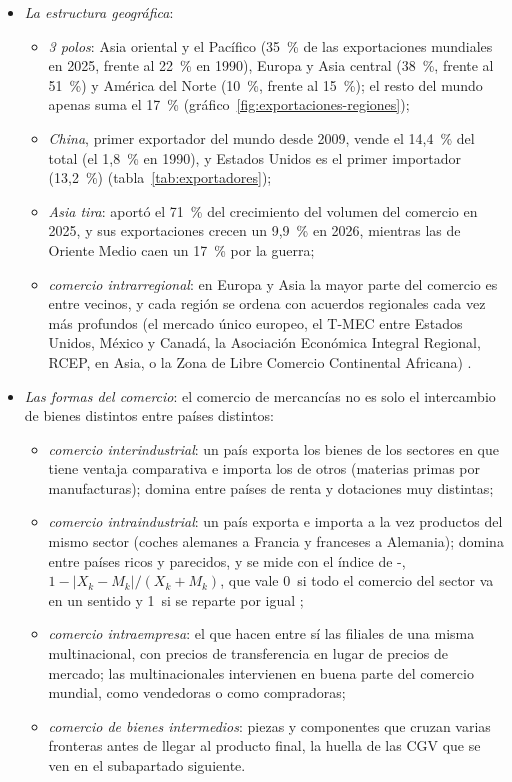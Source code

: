 \documentclass[11pt]{article}
\begin{document}
\begin{itemize}
\item \emph{La estructura geográfica}\nocite{OMC2026GTOS,BM2026WDIMercancias32}:
  \begin{itemize}
  \item \emph{3 polos}: Asia oriental y el Pacífico (35~\% de las exportaciones mundiales en 2025, frente al 22~\% en 1990), Europa y Asia central (38~\%, frente al 51~\%) y América del Norte (10~\%, frente al 15~\%); el resto del mundo apenas suma el 17~\% (gráfico~\ref{fig:exportaciones-regiones})\nocite{BM2026WDIMercancias32};
  \item \emph{China}, primer exportador del mundo desde 2009, vende el 14,4~\% del total (el 1,8~\% en 1990), y Estados Unidos es el primer importador (13,2~\%) (tabla~\ref{tab:exportadores});
  \item \emph{Asia tira}: aportó el 71~\% del crecimiento del volumen del comercio en 2025, y sus exportaciones crecen un 9,9~\% en 2026, mientras las de Oriente Medio caen un 17~\% por la guerra\nocite{OMC2026PerspectivasOct};
  \item \emph{comercio intrarregional}: en Europa y Asia la mayor parte del comercio es entre vecinos, y cada región se ordena con acuerdos regionales cada vez más profundos (el mercado único europeo, el T-MEC entre Estados Unidos, México y Canadá, la Asociación Económica Integral Regional, RCEP, en Asia, o la Zona de Libre Comercio Continental Africana)  .
  \end{itemize}
\item \emph{Las formas del comercio}: el comercio de mercancías no es solo el intercambio de bienes distintos entre países distintos:
  \begin{itemize}
  \item \emph{comercio interindustrial}: un país exporta los bienes de los sectores en que tiene ventaja comparativa e importa los de otros (materias primas por manufacturas); domina entre países de renta y dotaciones muy distintas;
  \item \emph{comercio intraindustrial}: un país exporta e importa a la vez productos del mismo sector (coches alemanes a Francia y franceses a Alemania); domina entre países ricos y parecidos, y se mide con el índice de -, $1-\lvert X_k-M_k\rvert/(X_k+M_k)$, que vale 0~si todo el comercio del sector va en un sentido y 1~si se reparte por igual\nocite{GrubelLloyd1975} ;
  \item \emph{comercio intraempresa}: el que hacen entre sí las filiales de una misma multinacional, con precios de transferencia en lugar de precios de mercado; las multinacionales intervienen en buena parte del comercio mundial, como vendedoras o como compradoras;
  \item \emph{comercio de bienes intermedios}: piezas y componentes que cruzan varias fronteras antes de llegar al producto final, la huella de las CGV que se ven en el subapartado siguiente.
  \end{itemize}
\end{itemize}
\end{document}
